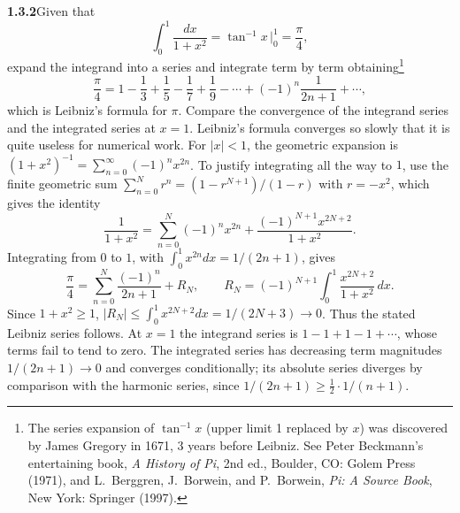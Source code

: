 \par\bigskip
\noindent\textbf{1.3.2}\quad Given that
\[
\int_{0}^{1}\frac{dx}{1+x^{2}}=\tan^{-1}x\,\Big|_{0}^{1}=\frac{\pi}{4},
\]
expand the integrand into a series and integrate term by term
obtaining\footnote{The series expansion of $\tan^{-1}x$ (upper limit 1
replaced by $x$) was discovered by James Gregory in 1671, 3 years before
Leibniz. See Peter Beckmann's entertaining book, \emph{A History of Pi}, 2nd
ed., Boulder, CO: Golem Press (1971), and L.~Berggren, J.~Borwein, and
P.~Borwein, \emph{Pi: A Source Book}, New York: Springer (1997).}
\[
\frac{\pi}{4}=1-\frac{1}{3}+\frac{1}{5}-\frac{1}{7}+\frac{1}{9}-\cdots
+(-1)^{n}\frac{1}{2n+1}+\cdots,
\]
which is Leibniz's formula for $\pi$. Compare the convergence of the integrand
series and the integrated series at $x=1$. Leibniz's formula converges so
slowly that it is quite useless for numerical work.
\solution
For $|x|<1$, the geometric expansion is
$(1+x^2)^{-1}=\sum_{n=0}^\infty(-1)^n x^{2n}$.
To justify integrating all the way to $1$, use the finite geometric sum
$\sum_{n=0}^Nr^n=(1-r^{N+1})/(1-r)$ with $r=-x^2$, which gives the
identity
\[
 \frac1{1+x^2}=\sum_{n=0}^N(-1)^n x^{2n}
              +\frac{(-1)^{N+1}x^{2N+2}}{1+x^2}.
\]
Integrating from $0$ to $1$, with $\int_0^1x^{2n}dx=1/(2n+1)$, gives
\[
 \frac\pi4=\sum_{n=0}^N\frac{(-1)^n}{2n+1}+R_N,
 \qquad R_N=(-1)^{N+1}\int_0^1\frac{x^{2N+2}}{1+x^2}\,dx.
\]
Since $1+x^2\ge1$, $|R_N|\le\int_0^1x^{2N+2}dx=1/(2N+3)\to0$.
Thus the stated Leibniz series follows. At $x=1$ the integrand series
is $1-1+1-1+\cdots$, whose terms fail to tend to zero. The integrated
series has decreasing term magnitudes $1/(2n+1)\to0$ and converges
conditionally; its absolute series diverges by comparison with the
harmonic series, since $1/(2n+1)\ge\frac12\cdot1/(n+1)$.


